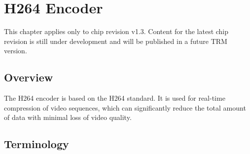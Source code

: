 \documentclass[main\_\_EN.tex]{subfiles}
\begin{document}

\ifglobal
\else
    \listoftodos
    {\let\clearpage\relax \listofdonetodos}
    \tableofcontents
\fi



\hypertarget{h264enc}{}
\chapter{H264 Encoder}\label{mod:h264enc}

\begin{tiplisting}
This chapter applies only to \chipname{} chip revision v1.3. Content for the latest chip revision is still under development and will be published in a future TRM version.
\end{tiplisting}


\section{Overview}

The H264 encoder is based on the H264 standard. It is used for real-time compression of video sequences, which can significantly reduce the total amount of data with minimal loss of video quality.


\section{Terminology}
\end{document}
